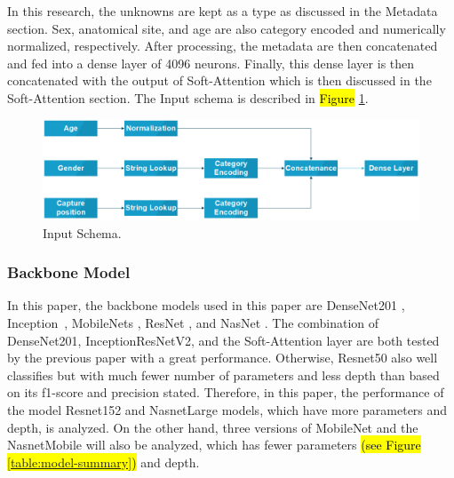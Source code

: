 \documentclass[sensors,article,accept,pdftex,moreauthors]{Definitions/mdpi}
\begin{document}
	In this research, the unknowns are kept as a type as discussed in the Metadata section. Sex, anatomical site, and age are also category encoded and numerically normalized, respectively. After processing, the metadata are then concatenated and fed into a dense layer of 4096 neurons. Finally, this dense layer is then concatenated with the output of Soft-Attention which is then discussed in the Soft-Attention section. The Input schema is described in \hl{Figure} %
 \ref{fig:input-schema}.
	
	\begin{figure}[H]
		\includegraphics[width=1\linewidth]{"Definitions/Input Schema"}
		\caption{Input Schema.}
		\label{fig:input-schema}
	\end{figure}
	
	\subsubsection{Backbone Model}
	In this paper, the backbone models used in this paper are DenseNet201 \cite{06993}, Inception~\cite{00567}, MobileNets \cite{04861,04381,02244}, ResNet \cite{03385,05027}, and NasNet \cite{07012}. The combination of DenseNet201, InceptionResNetV2, and the Soft-Attention layer are both tested by the previous paper \cite{03358} with a great performance. Otherwise, Resnet50 also well classifies but with much fewer number of parameters and less depth than based on its f1-score and precision stated. Therefore, in this paper, the performance of the model Resnet152 and NasnetLarge models, which have more parameters and depth, is analyzed. On the other hand, three versions of MobileNet and the NasnetMobile will also be analyzed, which has fewer parameters \hl{(see Figure \mbox{\ref{table:model-summary}})} and depth. 
	
\end{document}
